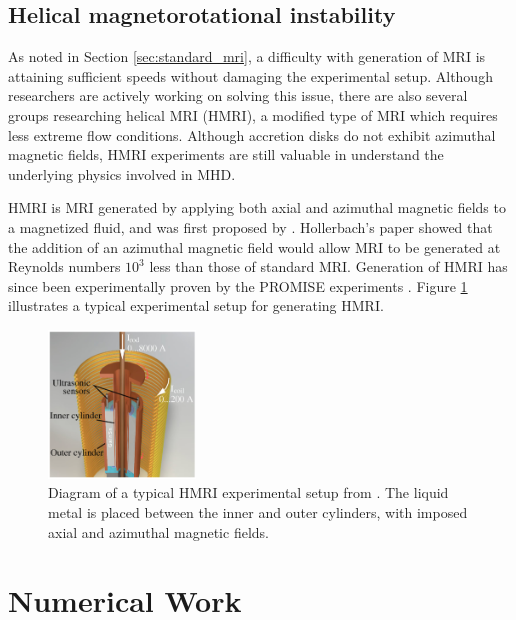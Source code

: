 \documentclass{jfm}
\begin{document}
%
%
\subsection{Helical magnetorotational instability}

As noted in Section \ref{sec:standard_mri}, a difficulty with generation of
MRI is attaining sufficient speeds without damaging the experimental setup. 
Although researchers are actively working on solving this issue, there are also
several groups researching helical MRI (HMRI), a modified type of MRI which requires 
less extreme flow conditions. Although accretion disks do not exhibit azimuthal
magnetic fields, HMRI experiments are still valuable in understand the underlying
physics involved in MHD.

HMRI is MRI generated by applying both axial and azimuthal magnetic fields to a 
magnetized fluid, and was first proposed by \cite{Hollerbach2005}. Hollerbach's
paper showed that the addition of an azimuthal magnetic field would allow MRI
to be generated at Reynolds numbers $10^3$ less than those of standard MRI. 
Generation of HMRI has since been experimentally proven by the PROMISE experiments
\citep[see][]{Stefani2006, Stefani2007, Stefani2009, Stefani2012}. Figure 
\ref{fig:diagram_hrmi} illustrates a typical experimental setup for generating HMRI.

\begin{figure}
    \centering
    \includegraphics[width=0.35\textwidth]{HMRI_diagram}
    \caption{Diagram of a typical HMRI experimental setup from \cite{Ji2010}. The liquid metal is placed between the inner and outer cylinders, with imposed axial and azimuthal magnetic fields.}
    \label{fig:diagram_hrmi}
\end{figure}



\section{Numerical Work}
\end{document}
